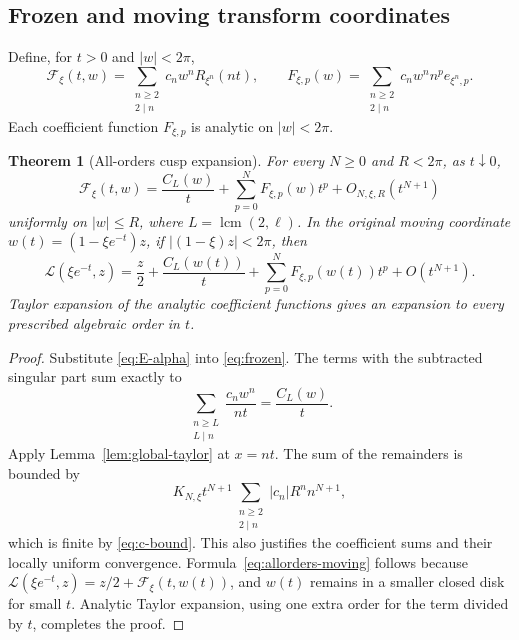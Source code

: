 \documentclass[11pt,a4paper]{article}
\numberwithin{equation}{section}
\newtheorem{theorem}{Theorem}[section]
\theoremstyle{definition}
\theoremstyle{remark}
\newcommand{\lcm}{\operatorname{lcm}}
\newcommand{\LL}{\mathcal L}
\begin{document}
\subsection{Frozen and moving transform coordinates}
Define, for \(t>0\) and \(|w|<2\pi\),
\begin{equation}\label{eq:frozen}
 \mathcal F_\xi(t,w)=\sum_{\substack{n\ge2\\2\mid n}}
          c_n w^n R_{\xi^n}(nt),
\qquad
 F_{\xi,p}(w)=\sum_{\substack{n\ge2\\2\mid n}}
          c_nw^n n^p e_{\xi^n,p}.
\end{equation}
Each coefficient function \(F_{\xi,p}\) is analytic on \(|w|<2\pi\).

\begin{theorem}[All-orders cusp expansion]\label{thm:allorders}
For every \(N\ge0\) and \(R<2\pi\), as \(t\downarrow0\),
\begin{equation}\label{eq:frozen-expansion}
 \mathcal F_\xi(t,w)
 =\frac{C_L(w)}t+\sum_{p=0}^N F_{\xi,p}(w)t^p
       +O_{N,\xi,R}(t^{N+1})
\end{equation}
uniformly on \(|w|\le R\), where \(L=\lcm(2,\ell)\). In the original moving coordinate \(w(t)=(1-\xi e^{-t})z\), if \(|(1-\xi)z|<2\pi\), then
\begin{equation}\label{eq:allorders-moving}
 \LL(\xi e^{-t},z)=\frac z2+\frac{C_L(w(t))}{t}
          +\sum_{p=0}^N F_{\xi,p}(w(t))t^p+O(t^{N+1}).
\end{equation}
Taylor expansion of the analytic coefficient functions gives an expansion to every prescribed algebraic order in \(t\).
\end{theorem}
\begin{proof}
Substitute \eqref{eq:E-alpha} into \eqref{eq:frozen}. The terms with the subtracted singular part sum exactly to
\[
 \sum_{\substack{n\ge L\\L\mid n}}\frac{c_nw^n}{nt}=\frac{C_L(w)}t.
\]
Apply Lemma~\ref{lem:global-taylor} at \(x=nt\). The sum of the remainders is bounded by
\[
 K_{N,\xi}t^{N+1}
 \sum_{\substack{n\ge2\\2\mid n}}|c_n|R^n n^{N+1},
\]
which is finite by \eqref{eq:c-bound}. This also justifies the coefficient sums and their locally uniform convergence. Formula~\eqref{eq:allorders-moving} follows because \(\LL(\xi e^{-t},z)=z/2+\mathcal F_\xi(t,w(t))\), and \(w(t)\) remains in a smaller closed disk for small \(t\). Analytic Taylor expansion, using one extra order for the term divided by \(t\), completes the proof.
\end{proof}
\end{document}
